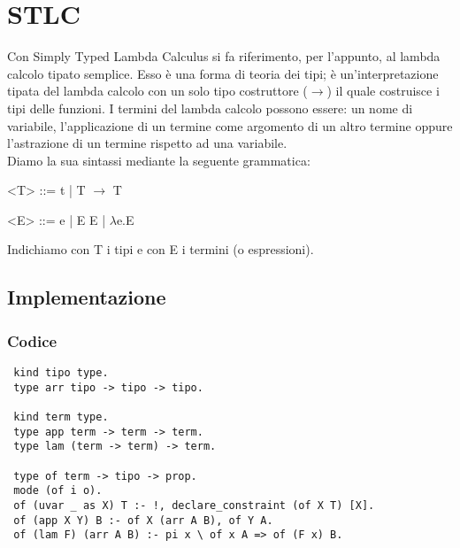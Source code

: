 \documentclass[12pt,a4paper,openright,twoside]{report}
\begin{document}
\section{STLC}

Con Simply Typed Lambda Calculus si fa riferimento, per l'appunto, al lambda calcolo tipato semplice. Esso è una forma di teoria dei tipi; è un'interpretazione tipata del lambda calcolo con un solo tipo costruttore ($\rightarrow$) il quale costruisce i tipi delle funzioni. I termini del lambda calcolo possono essere: un nome di variabile, l'applicazione di un termine come argomento di un altro termine oppure l'astrazione di un termine rispetto ad una variabile.\\
Diamo la sua sintassi mediante la seguente grammatica:
\begin{grammar}\centering
 \let\syntleft\relax    %
 \let\syntright\relax   %
 <T> ::= t | T $\rightarrow$ T
 
 <E> ::= e | E E | $\lambda$e.E
\end{grammar}
Indichiamo con T i tipi e con E i termini (o espressioni).

\subsection{Implementazione}

\subsubsection{Codice}
\begin{verbatim}
 kind tipo type.
 type arr tipo -> tipo -> tipo.

 kind term type.
 type app term -> term -> term.
 type lam (term -> term) -> term.

 type of term -> tipo -> prop.
 mode (of i o).
 of (uvar _ as X) T :- !, declare_constraint (of X T) [X].
 of (app X Y) B :- of X (arr A B), of Y A.
 of (lam F) (arr A B) :- pi x \ of x A => of (F x) B.
\end{verbatim}
\end{document}
